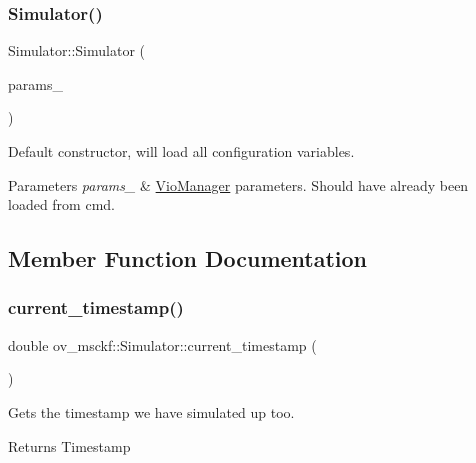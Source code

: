 \subsubsection{\texorpdfstring{Simulator()}{Simulator()}}
{\footnotesize\ttfamily Simulator\+::\+Simulator (\begin{DoxyParamCaption}\item[{\hyperlink{structov__msckf_1_1VioManagerOptions}{Vio\+Manager\+Options} \&}]{params\+\_\+ }\end{DoxyParamCaption})}



Default constructor, will load all configuration variables. 


\begin{DoxyParams}{Parameters}
{\em params\+\_\+} & \hyperlink{classov__msckf_1_1VioManager}{Vio\+Manager} parameters. Should have already been loaded from cmd. \\
\hline
\end{DoxyParams}


\subsection{Member Function Documentation}
\mbox{\label{classov__msckf_1_1Simulator_a10fbc2c949b380e152a3b9097b5b6643}} 
\subsubsection{\texorpdfstring{current\+\_\+timestamp()}{current\_timestamp()}}
{\footnotesize\ttfamily double ov\+\_\+msckf\+::\+Simulator\+::current\+\_\+timestamp (\begin{DoxyParamCaption}{ }\end{DoxyParamCaption})\hspace{0.3cm}{\ttfamily [inline]}}



Gets the timestamp we have simulated up too. 

\begin{DoxyReturn}{Returns}
Timestamp 
\end{DoxyReturn}
\mbox{\label{classov__msckf_1_1Simulator_a511b2edf20545972ced008fddb0654ae}} 
